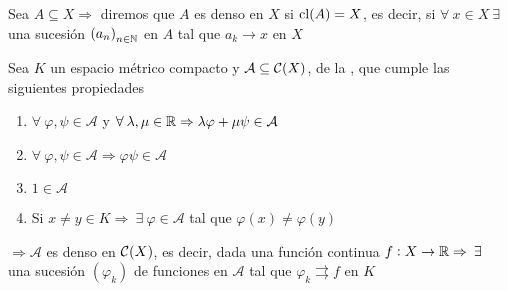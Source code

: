 \begin{definition}
    Sea $A \subseteq X \Rightarrow$ diremos que $A$ es denso en $X$ si $\mathrm{cl}(A) = X$, es decir, si $\forall \: x \in X \: \exists$ una sucesión ${(a_n)}_{n \in \mathbb{N}}$ en $A$ tal que $a_k \to x$ en $X$
\end{definition}

\begin{theorem}
    Sea $K$ un espacio métrico compacto y $\mathcal{A} \subseteq \mathcal{C}(X)$, de la , que cumple las siguientes propiedades

    \begin{enumerate}
        \item $\forall \: \varphi, \psi \in \mathcal{A} $ y $\forall \: \lambda, \mu \in \mathbb{R} \Rightarrow \lambda \varphi + \mu \psi \in \mathcal{A}$
        \item $\forall \: \varphi, \psi \in \mathcal{A} \Rightarrow \varphi \psi \in \mathcal{A}$
        \item $1 \in \mathcal{A}$
        \item Si $x \neq y \in K \Rightarrow \: \exists \: \varphi \in \mathcal{A}$ tal que $\varphi(x) \neq \varphi(y)$
    \end{enumerate}

    $\Rightarrow \mathcal{A}$ es denso en $\mathcal{C}(X)$, es decir, dada una función continua $f : X \to \mathbb{R} \Rightarrow \: \exists \: $ una sucesión $(\varphi_k)$ de funciones en $\mathcal{A}$ tal que $\varphi_k \rightrightarrows f$ en $K$ 
\end{theorem}